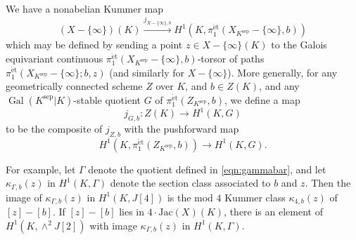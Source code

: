 \documentclass[11pt]{amsart}
\def\Z{\mathbb Z}
\def\F{\mathbb F}
\theoremstyle{plain}
\theoremstyle{definition}
\DeclareMathOperator{\Gal}{Gal}
\newcommand{\sep}{\mathrm{sep}}
\newcommand{\Jac}{\mathrm{Jac}}
\newcommand{\et}{\mathrm{\acute{e}t}}
\begin{document}
We have a nonabelian Kummer map
\[
(X-\{\infty \})(K) \stackrel{j_{X-\{ \infty \} ,b}}{\longrightarrow }H^1 (K,\pi _1 ^{\et }(X_{K^{\sep }}-\{\infty \} ,b)) 
\]
which may be defined by sending a point $z\in X-\{ \infty \} (K)$ to the Galois equivariant continuous $\pi _1 ^{\et}(X_{K^{\sep }}-\{ \infty \} ,b)$-torsor of paths $\pi _1 ^{\et }(X_{K^{\sep }}-\{ \infty \} ;b,z)$ (and similarly for $X-\{\infty \}$). More generally, for any geometrically connected scheme $Z$ over $K$, and $b\in Z(K)$, and any $\Gal (K^{\sep }|K)$-stable quotient $G$ of $\pi _1 ^{\et }(Z_{K^{\sep }},b)$, we define a map
\[
j_{G,b}:Z(K)\to H^1 (K,G)
\]
to be the composite of $j_{Z,b}$ with the pushforward map
\[
H^1 (K,\pi _1 ^{\et }(Z_{K^{\sep }},b))\to H^1 (K,G).
\] 

For example, let $\Gamma$ denote the quotient defined in \eqref{eqn:gammabar}, and let $\kappa _{\Gamma  ,b}(z)$ in $H^1 (K,\Gamma)$ denote the section class associated to $b$ and $z$. Then the image of $\kappa _{\Gamma  ,b}(z)$ in  $H^1 (K,J[4])$ is the mod $4$ Kummer class $\kappa _{4,b}(z)$ of $[z]-[b]$. If $[z]-[b]$ lies in $4\cdot \Jac (X)(K)$, there is an element of $H^1 (K,\wedge ^2 J[2])$ with image $\kappa _{\Gamma  ,b}(z)$ in $H^1 (K,\Gamma  )$.
\end{document}
